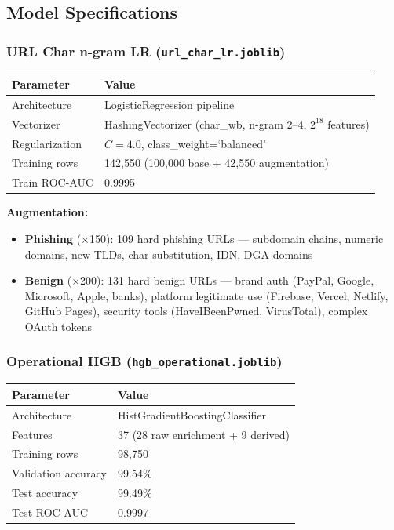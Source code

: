 \documentclass[11pt,a4paper]{article}
\newcommand{\code}[1]{\texttt{#1}}
\begin{document}
\subsection{Model Specifications}

\subsubsection*{URL Char n-gram LR (\code{url\_char\_lr.joblib})}

\begin{table}[h]
\centering
\begin{tabular}{ll}
\toprule
Parameter & Value \\
\midrule
Architecture & LogisticRegression pipeline \\
Vectorizer & HashingVectorizer (char\_wb, n-gram 2--4, $2^{18}$ features) \\
Regularization & $C=4.0$, class\_weight=`balanced' \\
Training rows & 142,550 (100,000 base + 42,550 augmentation) \\
Train ROC-AUC & 0.9995 \\
\bottomrule
\end{tabular}
\end{table}

\textbf{Augmentation:}
\begin{itemize}[noitemsep]
  \item \textbf{Phishing} ($\times$150): 109 hard phishing URLs ---
        subdomain chains, numeric domains, new TLDs, char substitution,
        IDN, DGA domains
  \item \textbf{Benign} ($\times$200): 131 hard benign URLs --- brand
        auth (PayPal, Google, Microsoft, Apple, banks), platform
        legitimate use (Firebase, Vercel, Netlify, GitHub Pages),
        security tools (HaveIBeenPwned, VirusTotal), complex OAuth
        tokens
\end{itemize}

\subsubsection*{Operational HGB (\code{hgb\_operational.joblib})}

\begin{table}[h]
\centering
\begin{tabular}{ll}
\toprule
Parameter & Value \\
\midrule
Architecture & HistGradientBoostingClassifier \\
Features & 37 (28 raw enrichment + 9 derived) \\
Training rows & 98,750 \\
Validation accuracy & 99.54\% \\
Test accuracy & 99.49\% \\
Test ROC-AUC & 0.9997 \\
\bottomrule
\end{tabular}
\end{table}
\end{document}
